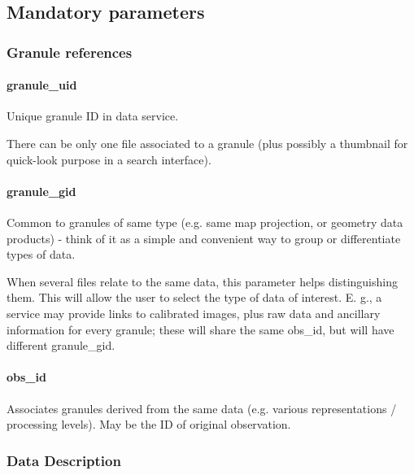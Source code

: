 \documentclass[11pt,a4paper]{ivoa}
\begin{document}




\subsection{Mandatory parameters}

\subsubsection{Granule references}

\paragraph{granule\_uid}

Unique granule ID in data service.

There can be only one file associated to a granule (plus possibly a thumbnail for quick-look purpose in a search interface).

\paragraph{granule\_gid}

Common to granules of same type (e.g. same map projection, or geometry data products) - think of it as a simple and convenient way to group or differentiate types of data.

When several files relate to the same data, this parameter helps distinguishing them. This will allow the user to select the type of data of interest. E. g., a service may provide links to calibrated images, plus raw data and ancillary information for every granule; these will share the same obs\_id, but will have different granule\_gid.

\paragraph{obs\_id}

Associates granules derived from the same data (e.g. various representations / processing levels). May be the ID of original observation.

\subsubsection{Data Description}
\end{document}
